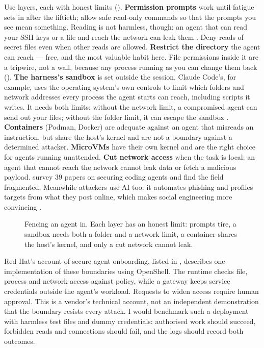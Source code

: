Use layers, each with honest limits (). \textbf{Permission prompts} work until
fatigue sets in after the fiftieth; allow safe read-only commands so that the
prompts you see mean something. Reading is not harmless, though: an agent
that can read your SSH keys or a  file and reach the network can
leak them \parencite{anthropic2025sandboxing}. Deny reads of secret files even
when other reads are allowed. \textbf{Restrict the directory} the agent can
reach --- free, and the most valuable habit here. File permissions inside it
are a tripwire, not a wall, because any process running as you can change them
back (). \textbf{The harness's sandbox} is set outside the
session. Claude Code's, for example, uses the operating system's own controls
to limit which folders and network addresses every process the agent starts
can reach, including scripts it writes. It needs both limits: without the
network limit, a compromised agent can send out your files; without the folder
limit, it can escape the sandbox \parencite{anthropic2025sandboxing}.
\textbf{Containers} (Podman,
Docker) are adequate against an agent that misreads an instruction, but share
the host's kernel and are not a boundary against a determined attacker.
\textbf{MicroVMs} have their own kernel and are the right choice for agents
running unattended. \textbf{Cut network access} when the task is local: an agent
that cannot reach the network cannot leak data or fetch a malicious payload.
\textcite{rashidi2026execsecurity} survey 39 papers on securing coding agents
and find the field fragmented. Meanwhile attackers use AI too: it automates phishing and
profiles targets from what they post online, which makes social engineering
more convincing \parencite{qasemi2026cyberattacks}.

\begin{figure}[htbp]
\centering
{}
\caption{Fencing an agent in. Each layer has an honest limit: prompts tire, a
sandbox needs both a folder and a network limit, a container shares the host's
kernel, and only a cut network cannot leak.}
\label{fig:fences}
\end{figure}

Red Hat's account of secure agent onboarding, listed in ,
describes one implementation of these boundaries using OpenShell. The runtime
checks file, process and network access against policy, while a gateway keeps
service credentials outside the agent's workload. Requests to widen access
require human approval. This is a vendor's technical account, not an independent
demonstration that the boundary resists every attack. I would benchmark such a
deployment with harmless test files and dummy credentials: authorised work
should succeed, forbidden reads and connections should fail, and the logs
should record both outcomes.

